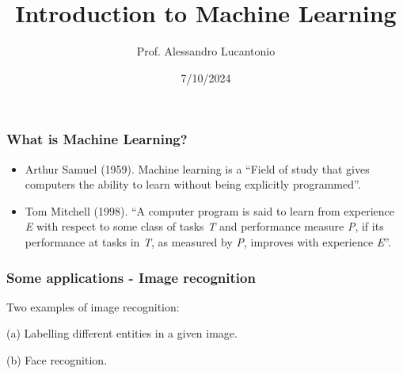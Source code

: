 \documentclass{beamer}
\title{Introduction to Machine Learning}
\author{Prof. Alessandro Lucantonio}
\institute{Aarhus University}
\date{7/10/2024}
\begin{document}
	
	\frame{\titlepage}
	
	\begin{frame}
		\frametitle{What is Machine Learning?}
		\begin{itemize}
			\item Arthur Samuel (1959). Machine learning is a ``Field of study that gives computers the ability to learn without being explicitly programmed”.
			\item Tom Mitchell (1998). ``A computer program is said to learn from experience \textit{E} with respect to some class of tasks \textit{T} and performance measure \textit{P}, if its performance at tasks in \textit{T}, as measured by \textit{P}, improves with experience \textit{E}”.
		\end{itemize}
		
	\end{frame}

	\begin{frame}		
		\frametitle{Some applications - Image recognition}
		\begin{figure}
			\centering
			\qquad
		\end{figure}
	Two examples of image recognition:
	
	(a) Labelling different entities in a given image.
	
	(b) Face recognition.
	\end{frame}
\end{document}
